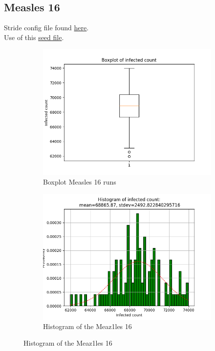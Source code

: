 \documentclass[a4paper]{article}
\begin{document}
\subsection{Measles 16}
Stride config file found \href{https://github.com/RobbeHeirman/Config1s/blob/master/config/run_random-geopop_nolog-measles.xml}{here}.\\
Use of this \href{https://github.com/RobbeHeirman/Configs/blob/master/100-random.txt}{seed file}.
\\

\begin{figure}[H]
\centering
\begin{subfigure}{.5\textwidth}
  \centering
  \includegraphics[width=1\linewidth]{Measles_16/Measles_16-boxplot.png}
  \caption{Boxplot Measles 16 runs }
  \label{fig:Boxplot_Measles_16}
\end{subfigure}%
\begin{subfigure}{.5\textwidth}
  \centering
  \includegraphics[width=1\linewidth]
  {Measles_16/Measles_16-histogram.png}
  \caption{Histogram of the Meaz1les 16}
  \label{fig:Histogram_Meazles_16}
\end{subfigure}


\end{figure}
\end{document}
